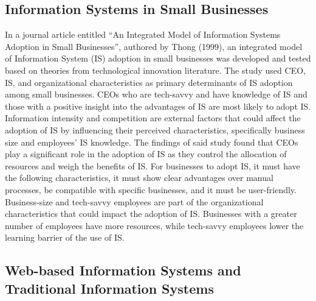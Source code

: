 \documentclass{icsthesis}
\begin{document}
\begin{mainmatter}
\subsection{\textbf{Information Systems in Small Businesses}
}
In a journal article entitled “An Integrated Model of Information Systems Adoption in Small Businesses”, authored by Thong (1999), an integrated model of Information System (IS) adoption in small businesses was developed and tested based on theories from technological innovation literature. The study used CEO, IS, and organizational characteristics as primary determinants of IS adoption among small businesses. CEOs who are tech-savvy and have knowledge of IS and those with a positive insight into the advantages of IS are most likely to adopt IS. Information intensity and competition are external factors that could affect the adoption of IS by influencing their perceived characteristics, specifically business size and employees’ IS knowledge. The findings of said study found that CEOs play a significant role in the adoption of IS as they control the allocation of resources and weigh the benefits of IS. For businesses to adopt IS, it must have the following characteristics, it must show clear advantages over manual processes, be compatible with specific businesses, and it must be user-friendly. Business-size and tech-savvy employees are part of the organizational characteristics that could impact the adoption of IS. Businesses with a greater number of employees have more resources, while tech-savvy employees lower the learning barrier of the use of IS.

\subsection{\textbf{Web-based Information Systems and Traditional Information Systems}}


\end{mainmatter}
\end{document}
